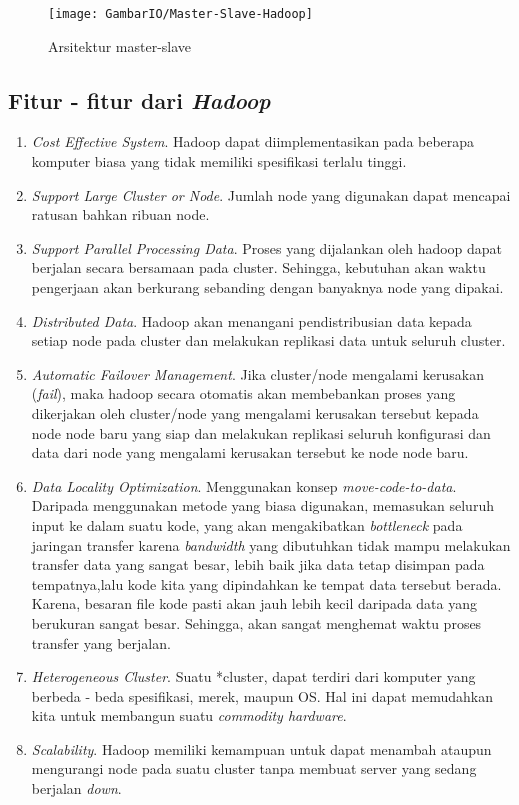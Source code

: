 	\begin{figure}[ht]
			\centering
			\texttt{[image: GambarIO/Master-Slave-Hadoop]}
			\caption[Arsitektur master-slave]{Arsitektur master-slave}
			\label{fig:Arsitektur master-slave}
		\end{figure}
	
	\subsection{Fitur - fitur dari \textit{Hadoop} \cite{Lam:2010:HA:1965594}}
	\begin{enumerate}
		\item \textit{Cost Effective System}.
		Hadoop dapat diimplementasikan pada beberapa komputer biasa yang tidak memiliki spesifikasi terlalu tinggi. 
		\item \textit{Support Large Cluster or Node}.
		Jumlah node yang digunakan dapat mencapai ratusan bahkan ribuan node.
		\item \textit{Support Parallel Processing Data}.
		Proses yang dijalankan oleh hadoop dapat berjalan secara bersamaan pada cluster. Sehingga, kebutuhan akan waktu pengerjaan akan berkurang sebanding dengan banyaknya node yang dipakai.
		\item \textit{Distributed Data}.
		Hadoop akan menangani pendistribusian data kepada setiap node pada cluster dan melakukan replikasi data untuk seluruh cluster.
		\item \textit{Automatic Failover Management}.
		Jika cluster/node mengalami kerusakan (\textit{fail}), maka hadoop secara otomatis akan membebankan proses yang dikerjakan oleh cluster/node yang mengalami kerusakan tersebut kepada node node baru yang siap dan melakukan replikasi seluruh konfigurasi dan data dari node yang mengalami kerusakan tersebut ke node node baru.
		\item \textit{Data Locality Optimization}.
		Menggunakan konsep \textit{move-code-to-data}. Daripada menggunakan metode yang biasa digunakan, memasukan seluruh input ke dalam suatu kode, yang akan mengakibatkan \textit{bottleneck} pada jaringan transfer karena \textit{bandwidth} yang dibutuhkan tidak mampu melakukan transfer data yang sangat besar, lebih baik jika data tetap disimpan pada tempatnya,lalu kode kita yang dipindahkan ke tempat data tersebut berada. Karena, besaran file kode pasti akan jauh lebih kecil daripada data yang berukuran sangat besar. Sehingga, akan sangat menghemat waktu proses transfer yang berjalan.
	\item \textit{Heterogeneous Cluster}.
	Suatu *cluster, dapat terdiri dari komputer yang berbeda - beda spesifikasi, merek, maupun OS. Hal ini dapat memudahkan kita untuk membangun suatu \textit{commodity hardware}.
	\item \textit{Scalability}.
	Hadoop memiliki kemampuan untuk dapat menambah ataupun mengurangi node pada suatu cluster tanpa membuat server yang sedang berjalan \textit{down}.
	\end{enumerate}
	
